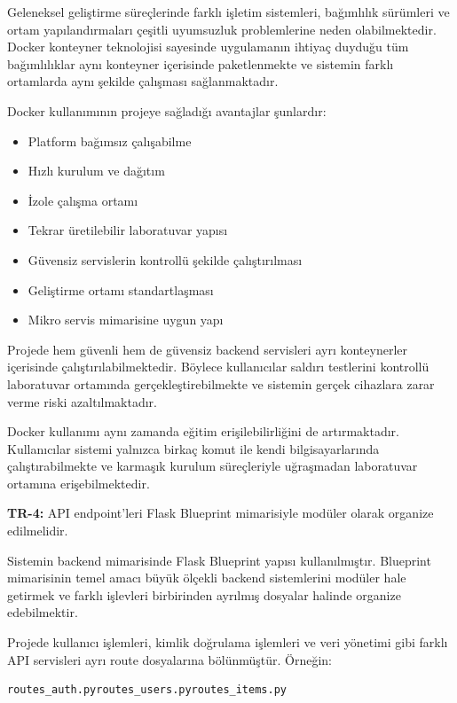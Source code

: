 Geleneksel geliştirme süreçlerinde farklı işletim sistemleri, bağımlılık sürümleri ve ortam yapılandırmaları çeşitli uyumsuzluk problemlerine neden olabilmektedir. Docker konteyner teknolojisi sayesinde uygulamanın ihtiyaç duyduğu tüm bağımlılıklar aynı konteyner içerisinde paketlenmekte ve sistemin farklı ortamlarda aynı şekilde çalışması sağlanmaktadır.

Docker kullanımının projeye sağladığı avantajlar şunlardır:

\begin{itemize}[leftmargin=*]
    \item Platform bağımsız çalışabilme
    \item Hızlı kurulum ve dağıtım
    \item İzole çalışma ortamı
    \item Tekrar üretilebilir laboratuvar yapısı
    \item Güvensiz servislerin kontrollü şekilde çalıştırılması
    \item Geliştirme ortamı standartlaşması
    \item Mikro servis mimarisine uygun yapı
\end{itemize}

Projede hem güvenli hem de güvensiz backend servisleri ayrı konteynerler içerisinde çalıştırılabilmektedir. Böylece kullanıcılar saldırı testlerini kontrollü laboratuvar ortamında gerçekleştirebilmekte ve sistemin gerçek cihazlara zarar verme riski azaltılmaktadır.

Docker kullanımı aynı zamanda eğitim erişilebilirliğini de artırmaktadır. Kullanıcılar sistemi yalnızca birkaç komut ile kendi bilgisayarlarında çalıştırabilmekte ve karmaşık kurulum süreçleriyle uğraşmadan laboratuvar ortamına erişebilmektedir.

\noindent\textbf{TR-4:} API endpoint’leri Flask Blueprint mimarisiyle modüler olarak organize edilmelidir.

Sistemin backend mimarisinde Flask Blueprint yapısı kullanılmıştır. Blueprint mimarisinin temel amacı büyük ölçekli backend sistemlerini modüler hale getirmek ve farklı işlevleri birbirinden ayrılmış dosyalar halinde organize edebilmektir.

Projede kullanıcı işlemleri, kimlik doğrulama işlemleri ve veri yönetimi gibi farklı API servisleri ayrı route dosyalarına bölünmüştür. Örneğin:

\begin{lstlisting}
routes_auth.pyroutes_users.pyroutes_items.py
\end{lstlisting}

